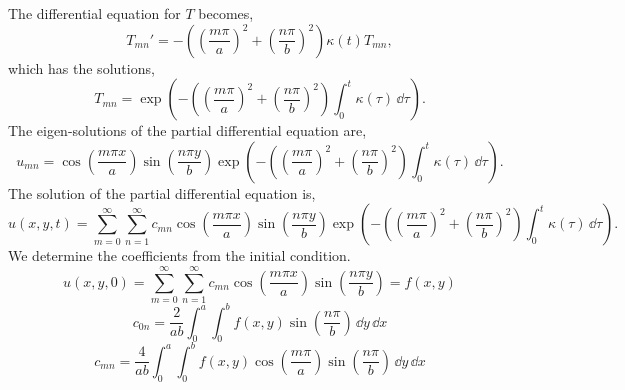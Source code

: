 {\begin{Solution}
  The differential equation for $T$ becomes,
  \[
  T_{m n}' = - \left( \left( \frac{m \pi}{a} \right)^2 + \left(
      \frac{n \pi}{b} \right)^2 \right) \kappa(t) T_{m n},
  \]
  which has the solutions,
  \[
  T_{m n} =  \exp \left( - \left( \left( \frac{m \pi}{a} \right)^2 + \left(
        \frac{n \pi}{b} \right)^2 \right) \int_0^t \kappa(\tau) \,\dd \tau
  \right).
  \]
  The eigen-solutions of the partial differential equation are,
  \[
  u_{m n} =  
  \cos \left( \frac{m \pi x}{a} \right)
  \sin \left( \frac{n \pi y}{b} \right)
  \exp \left( - \left( \left( \frac{m \pi}{a} \right)^2 + \left(
        \frac{n \pi}{b} \right)^2 \right) \int_0^t \kappa(\tau) \,\dd \tau \right).
  \]
  The solution of the partial differential equation is,
  \[
  \boxed{
    u(x,y,t) = \sum_{m=0}^\infty \sum_{n=1}^\infty c_{m n}
    \cos \left( \frac{m \pi x}{a} \right)
    \sin \left( \frac{n \pi y}{b} \right)
    \exp \left( - \left( \left( \frac{m \pi}{a} \right)^2 + \left(
          \frac{n \pi}{b} \right)^2 \right) \int_0^t \kappa(\tau) \,\dd \tau \right).
    }
  \]
  We determine the coefficients from the initial condition.
  \[
  u(x,y,0) = \sum_{m=0}^\infty \sum_{n=1}^\infty c_{m n}
  \cos \left( \frac{m \pi x}{a} \right)
  \sin \left( \frac{n \pi y}{b} \right)
  = f(x,y)
  \]
  \[
  \boxed{
    c_{0 n} = \frac{2}{a b} \int_0^a \int_0^b f(x,y) \sin \left( \frac{n \pi}{b}
    \right) \,\dd y \,\dd x
    }
  \]
  \[
  \boxed{
    c_{m n} = \frac{4}{a b} \int_0^a \int_0^b f(x,y) 
    \cos \left( \frac{m \pi}{a} \right)
    \sin \left( \frac{n \pi}{b} \right) \,\dd y \,\dd x
    }
  \]
\end{Solution}






}
